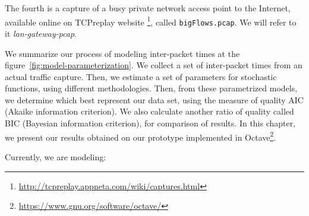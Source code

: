The fourth is a capture of a busy private network access point to the Internet, available online on TCPreplay website \footnote{ \href{http://tcpreplay.appneta.com/wiki/captures.html}{http://tcpreplay.appneta.com/wiki/captures.html}}, called \texttt{bigFlows.pcap}. We will refer to it \textit{lan-gateway-pcap}.






We summarize our process of modeling inter-packet times at the figure~\ref{fig:model-parameterization}. We collect a set of inter-packet times from an actual traffic capture. Then, we estimate a set of parameters for stochastic functions, using different methodologies. Then, from these parametrized models, we determine which best represent our data set, using the measure of quality AIC (Akaike information criterion). We also calculate another ratio of quality called BIC (Bayesian information criterion), for comparison of results. In this chapter, we present our results obtained on our prototype implemented in Octave\footnote{ \href{https://www.gnu.org/software/octave/}{https://www.gnu.org/software/octave/}}. 

Currently, we are modeling:

